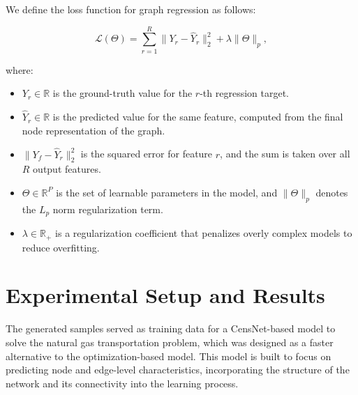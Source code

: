 We define the loss function for graph regression as follows:

\begin{equation}
    \mathcal{L}(\Theta) = \sum_{r=1}^{R} \| Y_r - \hat{Y}_r \|^2_2 + \lambda \|\Theta\|_p,
\end{equation}

\noindent where:

\begin{itemize}
    \item \( Y_r \in \mathbb{R} \) is the ground-truth value for the \( r \)-th regression target.
    \item \( \hat{Y}_r \in \mathbb{R} \) is the predicted value for the same feature, computed from the final node representation of the graph.
    \item \( \| Y_f - \hat{Y}_r \|^2_2 \) is the squared error for feature \( r \), and the sum is taken over all \( R \) output features.
    \item \( \Theta \in \mathbb{R}^{P} \) is the set of learnable parameters in the model, and \( \|\Theta\|_p \) denotes the \( L_p \) norm regularization term.
    \item \( \lambda \in \mathbb{R}_+ \) is a regularization coefficient that penalizes overly complex models to reduce overfitting.
\end{itemize}




\section{Experimental Setup and Results} \label{sec:LinealCensnet_ExperimentalSetup}

The generated samples served as training data for a CensNet-based model to solve the natural gas transportation problem, which was designed as a faster alternative to the optimization-based model. This model is built to focus on predicting node and edge-level characteristics, incorporating the structure of the network and its connectivity into the learning process. 


